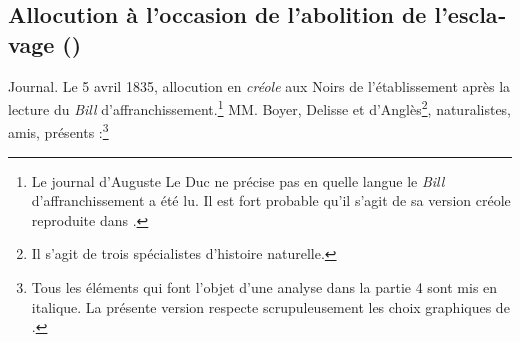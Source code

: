 \documentclass[output=paper]{langscibook}
\begin{document}
\begin{otherlanguage}{french}
\subsection{Allocution à l’occasion de l’abolition de l’esclavage (\citealt[92–96]{Pourcelet1994})}\label{sec:kriegel:3.1}

Journal. Le 5 avril 1835, allocution en \textit{créole} aux Noirs de l’établissement après la lecture du \textit{Bill} d’affranchissement.\footnote{Le journal d’Auguste Le Duc ne précise pas en quelle langue le \textit{Bill} d’affranchissement a été lu. Il est fort probable qu’il s’agit de sa version créole reproduite dans \citet[118]{Chaudenson1981}.} MM. Boyer, Delisse et d’Anglès\footnote{Il s’agit de trois spécialistes d’histoire naturelle.}, naturalistes, amis, présents :\footnote{Tous les éléments qui font l’objet d’une analyse dans la partie 4 sont mis en italique. La présente version respecte scrupuleusement les choix graphiques de \citet{Pourcelet1994}.}



\end{otherlanguage}
\end{document}
